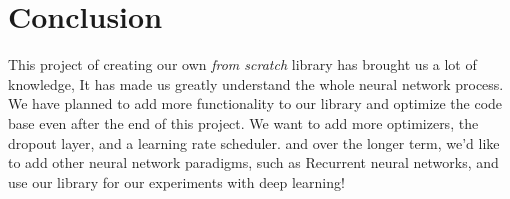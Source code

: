 \documentclass[a4paper, twocolumn, twoside]{article}
\begin{document}
	\section{Conclusion}
	This project of creating our own \textit{from scratch} library has brought us a lot of knowledge,
	It has made us greatly understand the whole neural network process.
	We have planned to add more functionality to our library and optimize the code base even after the end of this project.
	We want to add more optimizers, the dropout layer, and a learning rate scheduler.
	and over the longer term, we'd like to add other neural network paradigms, such as Recurrent neural networks, and use our library for our experiments with deep learning!
	\nocite{*}
	\printbibliography
\end{document}
